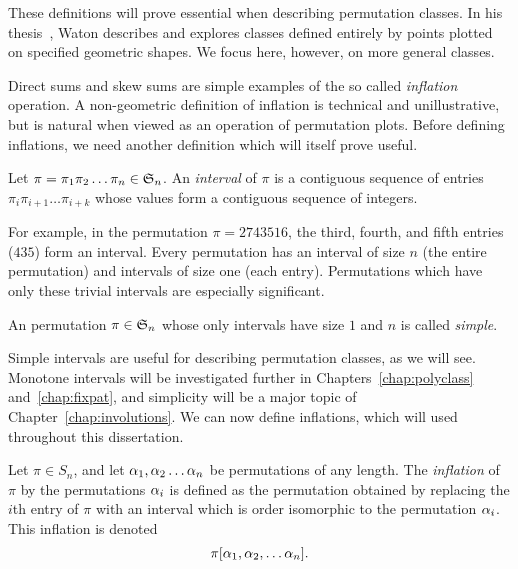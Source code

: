     These definitions will prove essential when describing permutation
    classes. In his thesis~\cite{SteveWaton2007}, Waton describes and explores
    classes defined entirely by points plotted on specified geometric shapes.
    We focus here, however, on more general classes. 

    Direct sums and skew sums are simple examples of the so called
    \emph{inflation} operation. A non-geometric definition of inflation is
    technical and unillustrative, but is natural when viewed as an operation of
    permutation plots. Before defining inflations, we need another definition
    which will itself prove useful. 

    \begin{definition}\label{prelim:def:interval}
      Let $\pi = \pi_1 \pi_2 \dots \pi_n \in \S_n$. An \emph{interval} of
      $\pi$ is a contiguous sequence of entries $\pi_i \pi_{i+1} \dots
      \pi_{i+k}$ whose values form a contiguous sequence of integers. 
    \end{definition}

    For example, in the permutation $\pi = 2743516$, the third,
    fourth, and fifth entries ($435$) form an interval. 
    Every permutation has an interval of size $n$ (the entire permutation) and
    intervals of size one (each entry).  Permutations which have only these
    trivial intervals are especially significant. 
    

    \begin{definition} \label{prelim:def:simple}
      An permutation $\pi \in \S_n$ whose only intervals have size $1$ and $n$ is
      called \emph{simple}. 
    \end{definition}
    
    Simple intervals are useful for describing permutation classes,
    as we will see.  Monotone intervals will be investigated further in
    Chapters~\ref{chap:polyclass} and~\ref{chap:fixpat},
    and simplicity will be a major topic of Chapter~\ref{chap:involutions}. We
    can now define inflations, which will used throughout this dissertation. 

    \begin{definition}\label{prelim:def:inflation}
      Let $\pi \in S_n$, and let $\alp_1, \alp_2 \dots \alp_n$ be 
      permutations of any length. The \emph{inflation} of $\pi$ by the
      permutations $\alp_i$ is defined as the permutation obtained by replacing
      the $i$th entry of $\pi$ with an interval which is order isomorphic to
      the permutation $\alp_i$.  This inflation is denoted 
      $$ \pi[\alp_1, \alp_2, \dots \alp_n].$$
    \end{definition}

